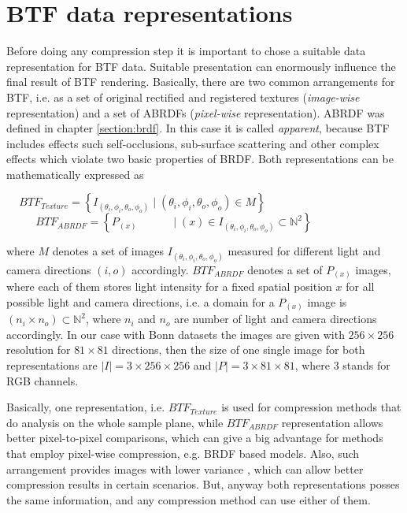 \chapter{BTF data representations}
\label{chapter:representations}




Before doing any compression step it is important to chose a suitable data representation for BTF data.
Suitable presentation can enormously influence the final result of BTF rendering.
 Basically, there are two common arrangements for BTF, i.e. as a set of original rectified and registered textures (\emph{image-wise} representation) and a set of ABRDFs (\emph{pixel-wise} representation).
 ABRDF was defined in chapter \ref{section:brdf}. In this case it is called \emph{apparent},
 because BTF includes effects such self-occlusions, sub-surface scattering and other complex effects which violate two basic properties of BRDF.
Both representations can be mathematically expressed as

{\centering $\,\,\,\,\,\,\,BTF_{Texture}=\left \{I_{(\theta_{i} ,\phi_{i},\theta_{o} ,\phi_{o}) }  \mid  (\theta_{i},\phi_{i},\theta_{o} ,\phi_{o})\in M \right \}$\\}
{\centering $\,\,\,\,\,\,\,\,\,\,\,\,\,\,\,\,BTF_{ABRDF}=\left \{P_{(x) } \,\,\,\,\,\,\,\,\,\,\,\,\,\,\,\,\,\,\mid  (x)\in I_{(\theta_{i} ,\phi_{i},\theta_{o} ,\phi_{o})}\subset \mathbb{N}^{2}\right \}$ \\}


where $M$ denotes a set of images $I_{(\theta_{i} ,\phi_{i},\theta_{o} ,\phi_{o})}$ measured for different light and camera directions $(i,o)$ accordingly.
$BTF_{ABRDF}$ denotes a set of $P_{(x)}$ images, where each of them stores light intensity for a fixed spatial position $x$ for all possible light and camera directions, 
i.e. a domain for a $P_{(x)}$ image is $(n_{i}\times n_{o})\subset \mathbb{N}^{2}$, where $n_{i}$ and $n_{o}$ are number of light and camera directions accordingly.
In our case with Bonn datasets the images are given with $256\times256$ resolution for $81\times81$ directions, 
then the size of one single image for both representations are $\left | I \right | = 3\times256\times256$ and $\left | P \right | = 3\times81\times81$, where $3$ stands for RGB channels.

Basically, one representation, i.e. $BTF_{Texture}$ is used for compression methods that do analysis on the whole sample plane, 
while $BTF_{ABRDF}$ representation allows better pixel-to-pixel comparisons, which can give a big advantage for methods that employ pixel-wise compression, e.g. BRDF based models.
Also, such arrangement provides images with lower variance \cite{haindl}, which can allow better compression results in certain scenarios.
But, anyway both representations posses the same information, and any compression method can use either of them.


